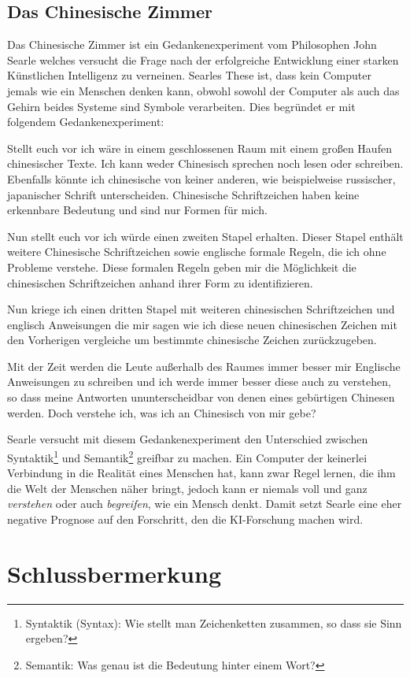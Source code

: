 \documentclass[a4paper,12pt,german,ngerman]{report}
\begin{document}
    \section{Das Chinesische Zimmer}
    Das Chinesische Zimmer ist ein Gedankenexperiment vom Philosophen John Searle welches
    versucht die Frage nach der erfolgreiche Entwicklung einer starken Künstlichen Intelligenz zu verneinen.
    Searles These ist, dass kein Computer jemals wie ein Menschen denken kann,
    obwohl sowohl der Computer als auch das Gehirn beides Systeme sind Symbole verarbeiten.\cite{nimtz2013chinesische}
    Dies begründet er mit folgendem Gedankenexperiment:
    \begin{displayquote}
        Stellt euch vor ich wäre in einem geschlossenen Raum mit einem großen Haufen chinesischer Texte.
        Ich kann weder Chinesisch sprechen noch lesen oder schreiben.
        Ebenfalls könnte ich chinesische von keiner anderen, wie beispielweise russischer, japanischer Schrift unterscheiden.
        Chinesische Schriftzeichen haben keine erkennbare Bedeutung und sind nur Formen für mich.

        Nun stellt euch vor ich würde einen zweiten Stapel erhalten. Dieser Stapel enthält weitere
        Chinesische Schriftzeichen sowie englische formale Regeln, die ich ohne Probleme verstehe.
        Diese formalen Regeln geben mir die Möglichkeit die chinesischen Schriftzeichen
        anhand ihrer Form zu identifizieren.

        Nun kriege ich einen dritten Stapel mit weiteren chinesischen Schriftzeichen und englisch Anweisungen die mir sagen wie ich
        diese neuen chinesischen Zeichen mit den Vorherigen vergleiche um bestimmte chinesische Zeichen zurückzugeben.

        Mit der Zeit werden die Leute außerhalb des Raumes immer besser mir Englische Anweisungen zu schreiben und
        ich werde immer besser diese auch zu verstehen, so dass meine Antworten ununterscheidbar von denen eines
        gebürtigen Chinesen werden. Doch verstehe ich, was ich an Chinesisch von mir gebe?
        \autocite[1]{searle1999chinese}
    \end{displayquote}
    Searle versucht mit diesem Gedankenexperiment den Unterschied zwischen
    Syntaktik\footnote{Syntaktik (Syntax): Wie stellt man Zeichenketten zusammen, so dass sie Sinn ergeben?}
    und Semantik\footnote{Semantik: Was genau ist die Bedeutung hinter einem Wort?}
    greifbar zu machen.
    Ein Computer der keinerlei Verbindung in die Realität eines Menschen hat, kann zwar Regel lernen, die ihm die
    Welt der Menschen näher bringt, jedoch kann er niemals voll und ganz \emph{verstehen} oder auch \emph{begreifen},
    wie ein Mensch denkt. Damit setzt Searle eine eher negative Prognose auf den Forschritt, den die KI-Forschung
    machen wird.

    \chapter{Schlussbermerkung}

    \printbibliography[title={Quellenverzeichnis}]
\end{document}
